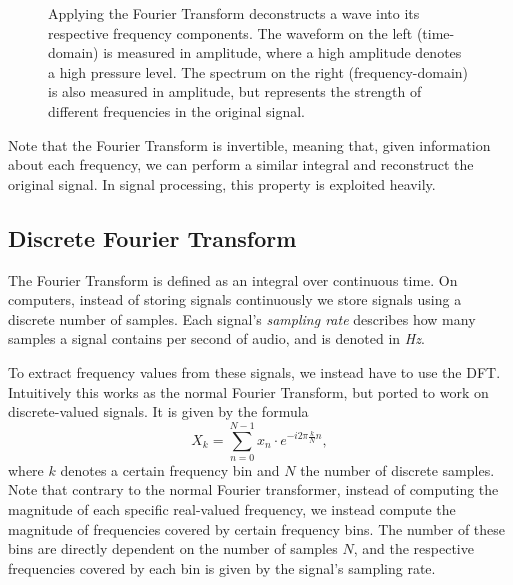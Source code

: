 \begin{figure}[H]
    \centering
    \hspace*{-1.3cm}
    \caption{Applying the Fourier Transform deconstructs a wave into its respective frequency components. The waveform on the left (time-domain) is measured in amplitude, where a high amplitude denotes a high pressure level. The spectrum on the right (frequency-domain) is also measured in amplitude, but represents the strength of different frequencies in the original signal.}
    \label{FTFigure}
\end{figure}

Note that the Fourier Transform is invertible, meaning that, given information about each frequency, we can perform a similar integral and reconstruct the original signal. In signal processing, this property is exploited heavily.

\subsection{Discrete Fourier Transform}

The Fourier Transform is defined as an integral over continuous time. On computers, instead of storing signals continuously we store signals using a discrete number of samples. Each signal's \textit{sampling rate} describes how many samples a signal contains per second of audio, and is denoted in \textit{Hz}.

To extract frequency values from these signals, we instead have to use the \gls{DFT}. Intuitively this works as the normal Fourier Transform, but ported to work on discrete-valued signals. It is given by the formula \[ X_k = \sum^{N - 1}_{n=0}{x_n \cdot e^{-i 2\pi \frac{k}{N} n}}, \] where $k$ denotes a certain frequency bin and $N$ the number of discrete samples. Note that contrary to the normal Fourier transformer, instead of computing the magnitude of each specific real-valued frequency, we instead compute the magnitude of frequencies covered by certain frequency bins. The number of these bins are directly dependent on the number of samples $N$, and the respective frequencies covered by each bin is given by the signal's sampling rate.

